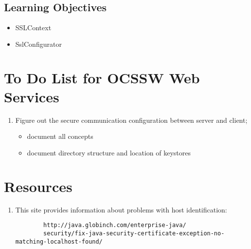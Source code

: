 \documentclass[11pt, oneside]{article}    %
\begin{document}
        \subsection*{\color{DarkTurquoise}Learning Objectives}
        \begin{itemize}
        \item SSLContext
        \item SslConfigurator
        \end{itemize}

        \pagebreak

        \section*{\color{DarkGreen}To Do List for OCSSW Web Services}

        \begin{enumerate}
        \item Figure out the secure communication configuration between server and client;
        \begin{itemize}
        \item document all concepts
        \item document directory structure and location of keystores
        \end{itemize}
        \end{enumerate}

        \pagebreak

        \section*{\color{DarkRed}Resources}

        \begin{enumerate}
        \item This site provides information about problems with host identification: \\
        \begin{verbatim}
        http://java.globinch.com/enterprise-java/
        security/fix-java-security-certificate-exception-no-matching-localhost-found/
        \end{verbatim}
        \end{enumerate}


        
\end{document}
